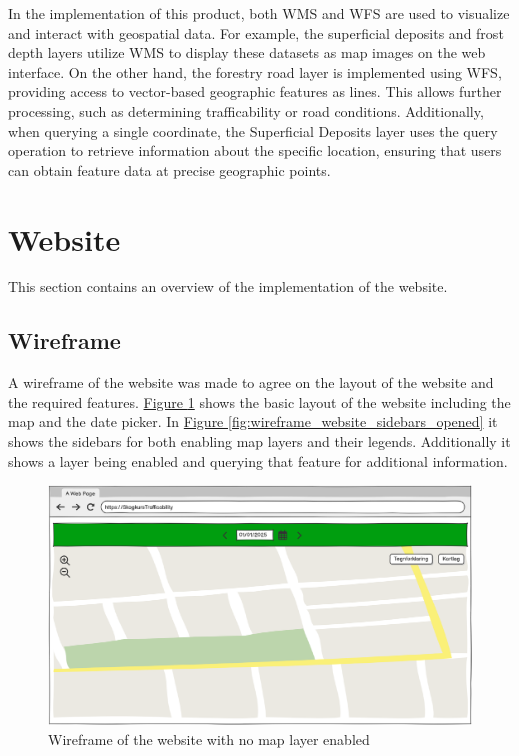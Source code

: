 In the implementation of this product, both WMS and WFS are used to visualize and interact with geospatial data. For example, the superficial deposits and frost depth layers utilize WMS to display these datasets as map images on the web interface. On the other hand, the forestry road layer is implemented using WFS, providing access to vector-based geographic features as lines. This allows further processing, such as determining \gls{trafficability} or road conditions. Additionally, when querying a single coordinate, the Superficial Deposits layer uses the query operation to retrieve information about the specific location, ensuring that users can obtain feature data at precise geographic points.

\section{Website}

This section contains an overview of the implementation of the website.

\subsection{Wireframe} %

A wireframe of the website was made to agree on the layout of the website and the required features. \hyperref[fig:wireframe_website_sidebars_closed]{Figure \ref*{fig:wireframe_website_sidebars_closed}} shows the basic layout of the website including the map and the date picker. In \hyperref[fig:wireframe_website_sidebars_opened]{Figure \ref*{fig:wireframe_website_sidebars_opened}} it shows the sidebars for both enabling map layers and their legends. Additionally it shows a layer being enabled and querying that feature for additional information.

\begin{figure}[h]
    \centering
    \includegraphics[width=0.6\linewidth]{figures/wireframe_website_sidebars_closed.pdf} 
    \caption{Wireframe of the website with no map layer enabled}
    \label{fig:wireframe_website_sidebars_closed}
\end{figure}

